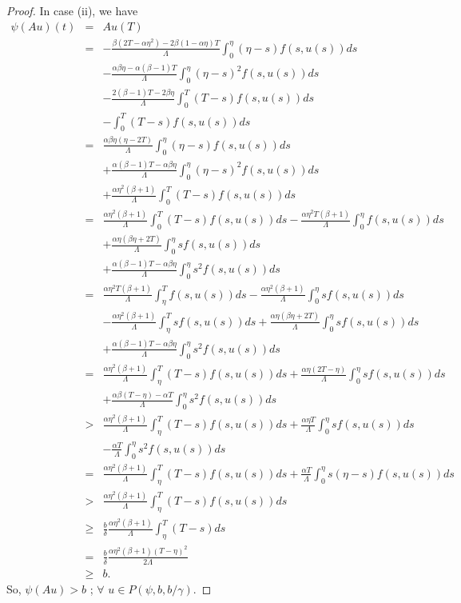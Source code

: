 \documentclass[reqno]{amsart}\usepackage{amsmath}
\begin{document}
\begin{proof}
In case (ii), we have
\begin{eqnarray*}
\psi(Au)(t)&=& Au(T)\\
&=&-\frac{\beta (2T-\alpha \eta ^{2})-2\beta (1-\alpha \eta
)T}{\Lambda}\int_{0}^{\eta }(\eta -s)f(s, u(s))ds \\
&&-\frac{\alpha \beta \eta -\alpha (\beta -1)T}{\Lambda}\int_{0}^{\eta}(\eta -s)^{2}f(s, u(s))ds \\
&&-\frac{2(\beta-1)T-2\beta \eta }{\Lambda}\int_{0}^{T}(T-s)f(s, u(s))ds \\
&&-\int_{0}^{T}(T-s)f(s, u(s))ds\\
&=&\frac{\alpha\beta\eta(\eta-2T)}{\Lambda}\int_{0}^{\eta}(\eta -s)f(s, u(s))ds \\
&&+\frac{\alpha(\beta-1)T-\alpha\beta\eta}{\Lambda}\int_{0}^{\eta}(\eta -s)^{2}f(s, u(s))ds \\
&&+\frac{\alpha\eta^{2}(\beta+1)}{\Lambda}\int_{0}^{T}(T-s)f(s, u(s))ds \\
&=&\frac{\alpha\eta^{2}(\beta+1)}{\Lambda}\int_{0}^{T}(T-s)f(s, u(s))ds
-\frac{\alpha\eta^{2}T(\beta+1)}{\Lambda}\int_{0}^{\eta}f(s, u(s))ds \\
&&+\frac{\alpha\eta(\beta\eta+2T)}{\Lambda}\int_{0}^{\eta}sf(s, u(s))ds\\
&&+\frac{\alpha(\beta-1)T-\alpha\beta\eta}{\Lambda}\int_{0}^{\eta}s^{2}f(s, u(s))ds\\
&=&\frac{\alpha\eta^{2}T(\beta+1)}{\Lambda}\int_{\eta}^{T}f(s, u(s))ds
-\frac{\alpha\eta^{2}(\beta+1)}{\Lambda}\int_{0}^{\eta}sf(s, u(s))ds \\
&&-\frac{\alpha\eta^{2}(\beta+1)}{\Lambda}\int_{\eta}^{T}sf(s, u(s))ds
+\frac{\alpha\eta(\beta\eta+2T)}{\Lambda}\int_{0}^{\eta}sf(s, u(s))ds\\
&&+\frac{\alpha(\beta-1)T-\alpha\beta\eta}{\Lambda}\int_{0}^{\eta}s^{2}f(s, u(s))ds\\
&=&\frac{\alpha\eta^{2}(\beta+1)}{\Lambda}\int_{\eta}^{T}(T-s)f(s, u(s))ds
+\frac{\alpha\eta(2T-\eta)}{\Lambda}\int_{0}^{\eta}sf(s, u(s))ds \\
&&+\frac{\alpha\beta(T-\eta)-\alpha T}{\Lambda}\int_{0}^{\eta}s^{2}f(s, u(s))ds\\
&>&\frac{\alpha\eta^{2}(\beta+1)}{\Lambda}\int_{\eta}^{T}(T-s)f(s, u(s))ds+
\frac{\alpha\eta T}{\Lambda}\int_{0}^{\eta}sf(s,u(s))ds\\
&&-\frac{\alpha T}{\Lambda}\int_{0}^{\eta}s^{2}f(s, u(s))ds\\
&=&\frac{\alpha\eta^{2}(\beta+1)}{\Lambda}\int_{\eta}^{T}(T-s)f(s, u(s))ds+
\frac{\alpha T}{\Lambda}\int_{0}^{\eta}s(\eta-s)f(s, u(s))ds\\
&>&\frac{\alpha\eta^{2}(\beta+1)}{\Lambda}\int_{\eta}^{T}(T-s)f(s, u(s))ds\\
&\geq&\frac{b}{\delta}\frac{\alpha\eta^{2}(\beta+1)}{\Lambda}\int_{\eta}^{T}(T-s)ds\\
&=&\frac{b}{\delta}\frac{\alpha\eta^{2}(\beta+1)(T-\eta)^{2}}{2\Lambda}\\
&\geq& b.
\end{eqnarray*}
So,  $\psi(Au)>b$ ; $ \forall$ $u\in P(\psi, b, b/\gamma)$.


\end{proof}
\end{document}
